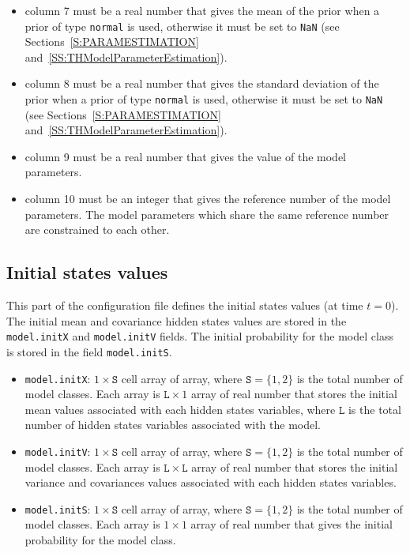 \begin{itemize}
\item column 7 must be a real number that gives the mean of the prior when a prior of type \lstinline[basicstyle = \mlttfamily \small ]!normal! is used, otherwise it must be set to \lstinline[basicstyle = \mlttfamily \small ]!NaN! (see Sections~\ref{S:PARAMESTIMATION} and~\ref{SS:THModelParameterEstimation}).
\item column 8 must be a real number that gives the standard deviation of the prior when a prior of type \lstinline[basicstyle = \mlttfamily \small ]!normal! is used, otherwise it must be set to \lstinline[basicstyle = \mlttfamily \small ]!NaN! (see Sections~\ref{S:PARAMESTIMATION} and~\ref{SS:THModelParameterEstimation}).
\item column 9 must be a real number that gives the value of the model parameters.
\item column 10 must be an integer that gives the reference number of the model parameters. The model parameters which share the same reference number are constrained to each other.
\end{itemize}

\subsection{Initial states values}
\label{SS:InitialHS}
This part of the configuration file defines the initial states values (at time $t=0$).
The initial mean and covariance hidden states values are stored in the \lstinline[basicstyle = \mlttfamily \small ]!model.initX! and \lstinline[basicstyle = \mlttfamily \small ]!model.initV! fields.
The initial probability for the model class is stored in the field \lstinline[basicstyle = \mlttfamily \small ]!model.initS!.

\begin{itemize}
\item \lstinline[basicstyle = \mlttfamily \small ]!model.initX!: $1\times \mathtt{S}$ cell array of array, where $\mathtt{S} = \{1, 2 \}$ is the total number of model classes.
Each array is $\mathtt{L}\times1$ array of real number that stores the initial mean values associated with each hidden states variables, where $\mathtt{L}$ is the total number of hidden states variables associated with the model.
\item \lstinline[basicstyle = \mlttfamily \small ]!model.initV!: $1\times \mathtt{S}$ cell array of array, where $\mathtt{S} = \{1, 2 \}$ is the total number of model classes.
Each array is $\mathtt{L}\times\mathtt{L}$ array of real number that stores the initial variance and covariances values associated with each hidden states variables.
\item \lstinline[basicstyle = \mlttfamily \small ]!model.initS!: $1\times \mathtt{S}$ cell array of array, where $\mathtt{S} = \{1, 2 \}$ is the total number of model classes. 
Each array is $1\times1$ array of real number that gives the initial probability for the model class.
\end{itemize}

